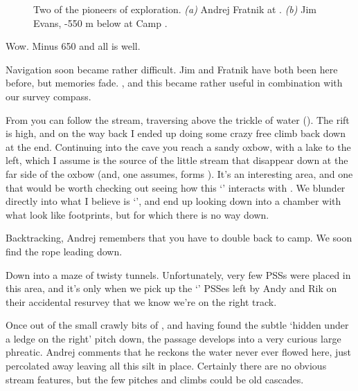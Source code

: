 \begin{figure}[t]
\begin{subfigure}[t]{0.49\textwidth}
			\caption{}\label{jim x-ray}
		\end{subfigure}
		\caption{Two of the pioneers of  exploration.
  \textit{(a)} Andrej Fratnik at . 
  \textit{(b)} Jim Evans, -550 m below at Camp . }
	\end{figure}


Wow. Minus 650 and all is well.

Navigation soon became rather difficult. Jim and Fratnik have both been
here before, but memories fade. , and this became rather useful
in combination with our survey compass.


From  you can follow the stream,
traversing above the trickle of water (). The rift is high,
and on the way back I ended up doing some crazy free climb back down at
the end. Continuing into the cave you reach a sandy oxbow, with a lake
to the left, which I assume is the source of the little stream that
disappear down at the far side of the oxbow (and, one assumes, forms
). It's an interesting area, and one that would be worth
checking out seeing how this `' interacts with . We blunder directly into what I believe is `',
and end up looking down into a chamber with what look like footprints,
but for which there is no way down.

Backtracking, Andrej remembers that you have to double back to camp. We soon find the rope leading down.

Down into a maze of twisty tunnels. Unfortunately, very few PSSs were
placed in this area, and it's only when we pick up the `' PSSes
left by Andy and Rik on their accidental resurvey that we know we're on
the right track.

Once out of the small crawly bits of , and having found the
subtle `hidden under a ledge on the right' pitch down, the passage
develops into a very curious large phreatic. Andrej comments that he
reckons the water never ever flowed here, just percolated away leaving
all this silt in place. Certainly there are no obvious stream features,
but the few pitches and climbs could be old cascades.

